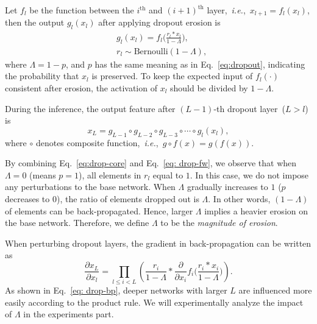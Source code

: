 \documentclass[letterpaper]{article} %
\def\ie{\emph{i.e.}}
\begin{document}
Let $f_l$ be the function between the $i^\text{th}$ and $(i+1)^\text{th}$ layer,~\ie,~$x_{l+1}=f_l(x_l)$, then the output $g_l(x_l)$ after applying dropout erosion is
\begin{equation} \label{eq:drop-core}
\begin{split}
& g_l(x_l) = f_l\Big(\frac{r_l*x_l}{1-\Lambda}\Big), \\
& r_l\sim\text{Bernoulli}(1-\Lambda),
\end{split}
\end{equation}
where $\Lambda=1-p$, and $p$ has the same meaning as in Eq.~\eqref{eq:dropout}, indicating the probability that $x_l$ is preserved. To keep the expected input of $f_l(\cdot)$ consistent after erosion, the activation of $x_l$ should be divided by $1-\Lambda$.

During the inference, the output feature after $(L-1)$-th dropout layer~($L>l$) is
\begin{equation} \label{eq: drop-fw}
x_{L} = g_{L-1}\circ g_{L-2}\circ g_{L-3}\circ\cdots\circ g_{l}(x_l),
\end{equation}
where $\circ$ denotes composite function,~\ie,~$g\circ f(x)=g\left(f(x)\right)$.

By combining Eq.~\eqref{eq:drop-core} and Eq.~\eqref{eq: drop-fw}, we observe that when $\Lambda=0$ (means $p = 1$), all elements in $r_l$ equal to $1$. In this case, we do not impose any perturbations to the base network. When $\Lambda$ gradually increases to $1$ ($p$ decreases to $0$), the ratio of elements dropped out is $\Lambda$. In other words, $(1-\Lambda)$ of elements can be back-propagated. Hence, larger $\Lambda$ implies a heavier erosion on the base network. Therefore, we define $\Lambda$ to be the \textit{magnitude of erosion}.

When perturbing dropout layers, the gradient in back-propagation can be written as
\begin{equation} \label{eq: drop-bp}
\frac{\partial x_{L}}{\partial x_l}=\prod_{l\leq i< L}\left(\frac{r_i}{1-\Lambda} * \frac{\partial }{\partial x_i}f_i\Big(\frac{r_i*x_i}{1-\Lambda}\Big)\right).
\end{equation}
As shown in Eq.~\eqref{eq: drop-bp}, deeper networks with larger $L$ are influenced more easily according to the product rule. We will experimentally analyze the impact of $\Lambda$ in the experiments part.
\end{document}
